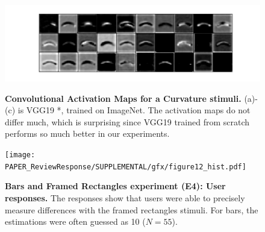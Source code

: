 \documentclass[journal]{vgtc}        %
\newcommand{\change}[1]{{#1}}
\begin{document}
\begin{figure}[tbhp]
{	  \includegraphics[width=.48\linewidth]{../gfx/ACTIVATIONMAPS/curvature_vgg_from_scratch_block3_conv3.pdf}
	}
	\hfill
	\hfill
  \caption{\textbf{Convolutional Activation Maps for a Curvature stimuli.} (a)-(c) is VGG19 *, trained on ImageNet. The activation maps do not differ much, which is surprising since VGG19 trained from scratch performs so much better in our experiments.}
	\label{fig:activationmaps2}
\end{figure}


\begin{figure}[tbhp]
    \centering
	\texttt{[image: PAPER\_ReviewResponse/SUPPLEMENTAL/gfx/figure12\_hist.pdf]}
    \caption{\change{\textbf{Bars and Framed Rectangles experiment (E4): User responses.} The responses show that users were able to precisely measure differences with the framed rectangles stimuli. For bars, the estimations were often guessed as 10 ($N=55$).}}
\end{figure}
\end{document}
